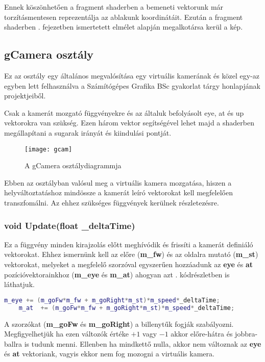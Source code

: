 Ennek köszönhetően a fragment shaderben a bemeneti vektorunk már torzításmentesen reprezentálja az ablakunk koordinátáit. Ezután a fragment shaderben . fejezetben ismertetett elmélet alapján megalkotársa kerül a kép.

\subsection{gCamera osztály}

Ez az osztály egy általános megvalósítása egy virtuális kamerának és közel egy-az egyben lett felhasználva a Számítógépes Grafika BSc gyakorlat tárgy honlapjának \cite{GrafikaB26:online} projektjeiből. 

Csak a kamerát mozgató függvényekre és az általuk befolyásolt eye, at és up vektorokra van szükség. Ezen három vektor segítségével lehet majd a shaderben megállapítani a sugarak irányát és kiindulási pontját.

\begin{figure}[H]
	\centering
	\texttt{[image: gcam]}
	\caption{A gCamera osztálydiagrammja}
	\label{fig:gcam}
\end{figure}

Ebben az osztályban valósul meg a virtuális kamera mozgatása, hiszen a helyváltoztatáshoz mindössze a kamerát leíró vektorokat kell megfelelően transzfomálni. Az ehhez szükséges függvények kerülnek részletezésre.

\subsubsection{void Update(float \_deltaTime)}

Ez a függvény minden kirajzolás előtt meghívódik és frissíti a kamerát definiáló vektorokat. Ehhez ismernünk kell az előre (\textbf{m\_fw}) és az oldalra mutató (\textbf{m\_st}) vektorokat, melyeket a megfelelő szorzóval egyszerűen hozzáadunk az \textbf{eye} és \textbf{at} pozícióvektorainkhoz (\textbf{m\_eye} és \textbf{m\_at}) ahogyan azt . kódrészletben is láthatjuk.

\begin{lstlisting}[language={C++}]
	m_eye += (m_goFw*m_fw + m_goRight*m_st)*m_speed*_deltaTime;
	m_at  += (m_goFw*m_fw + m_goRight*m_st)*m_speed*_deltaTime;
\end{lstlisting}

A szorzókat (\textbf{m\_goFw} és \textbf{m\_goRight}) a billenytűk fogják szabályozni. Megfigyelhetjük ha ezen változók értéke $+1$ vagy $-1$ akkor előre-hátra és jobbra-ballra is tudunk menni. Ellenben ha mindkettő nulla, akkor nem változnak az \textbf{eye} és \textbf{at} vektoriank, vagyis ekkor nem fog mozogni a virtuális kamera. 

